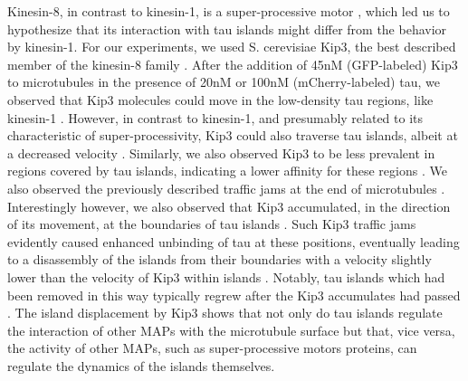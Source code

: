 Kinesin-8, in contrast to kinesin-1, is a super-processive motor , which led us to hypothesize that its interaction with tau islands might differ from the behavior by kinesin-1. For our experiments, we used S. cerevisiae Kip3, the best described member of the kinesin-8 family . After the addition of 45nM (GFP-labeled) Kip3 to microtubules in the presence of 20nM or 100nM (mCherry-labeled) tau, we observed that Kip3 molecules could move in the low-density tau regions, like kinesin-1 . However, in contrast to kinesin-1, and presumably related to its characteristic of super-processivity, Kip3 could also traverse tau islands, albeit at a decreased velocity . Similarly, we also observed Kip3 to be less prevalent in regions covered by tau islands, indicating a lower affinity for these regions . We also observed the previously described  traffic jams at the end of microtubules . Interestingly however, we also observed that Kip3 accumulated, in the direction of its movement, at the boundaries of tau islands . Such Kip3 traffic jams evidently caused enhanced unbinding of tau at these positions, eventually leading to a disassembly of the islands from their boundaries with a velocity slightly lower than the velocity of Kip3 within islands . Notably, tau islands which had been removed in this way typically regrew after the Kip3 accumulates had passed . The island displacement by Kip3 shows that not only do tau islands regulate the interaction of other MAPs with the microtubule surface but that, vice versa, the activity of other MAPs, such as super-processive motors proteins, can regulate the dynamics of the islands themselves.

\FloatBarrier
